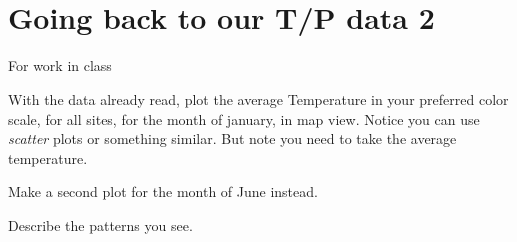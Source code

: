 \documentclass[11pt]{article}
\begin{document}
    \begin{center}
    \end{center}
    { \hspace*{\fill} \\}
    
    \begin{center}
    \end{center}
    { \hspace*{\fill} \\}
    
    \hypertarget{going-back-to-our-tp-data-2}{%
\section{Going back to our T/P data
2}\label{going-back-to-our-tp-data-2}}

For work in class

With the data already read, plot the average Temperature in your
preferred color scale, for all sites, for the month of january, in map
view. Notice you can use \emph{scatter} plots or something similar. But
note you need to take the average temperature.

Make a second plot for the month of June instead.

Describe the patterns you see.
\end{document}
